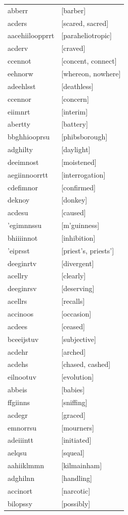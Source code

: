\documentclass{article}
\begin{document}
\begin{tabular}{ll}
abberr & [barber] \\
acders & [scared, sacred] \\
aacehiiloopprrt & [paraheliotropic] \\
acderv & [craved] \\
ccennot & [concent, connect] \\
eehnorw & [whereon, nowhere] \\
adeehlsst & [deathless] \\
ccennor & [concern] \\
eiimnrt & [interim] \\
abertty & [battery] \\
bbghhiooprsu & [phibsborough] \\
adghilty & [daylight] \\
deeimnost & [moistened] \\
aegiinnoorrtt & [interrogation] \\
cdefimnor & [confirmed] \\
deknoy & [donkey] \\
acdesu & [caused] \\
'egimnnssu & [m'guinness] \\
bhiiiinnot & [inhibition] \\
'eiprsst & [priest's, priests'] \\
deeginrtv & [divergent] \\
acellry & [clearly] \\
deeginrsv & [deserving] \\
acellrs & [recalls] \\
accinoos & [occasion] \\
acdees & [ceased] \\
bceeijstuv & [subjective] \\
acdehr & [arched] \\
acdehs & [chased, cashed] \\
eilnootuv & [evolution] \\
abbeis & [babies] \\
ffgiinns & [sniffing] \\
acdegr & [graced] \\
emnorrsu & [mourners] \\
adeiiintt & [initiated] \\
aelqsu & [squeal] \\
aahiiklmmn & [kilmainham] \\
adghilnn & [handling] \\
accinort & [narcotic] \\
bilopssy & [possibly] \\

\end{tabular}
\end{document}
